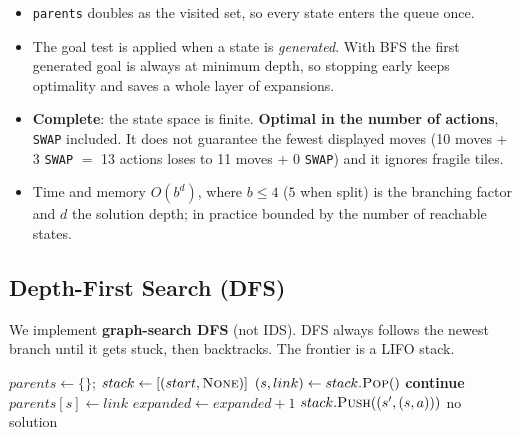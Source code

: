 \begin{itemize}[leftmargin=*]
\item \texttt{parents} doubles as the visited set, so every state enters the queue once.
\item The goal test is applied when a state is \emph{generated}. With BFS the first generated goal
is always at minimum depth, so stopping early keeps optimality and saves a whole layer of
expansions.
\item \textbf{Complete}: the state space is finite. \textbf{Optimal in the number of actions},
\texttt{SWAP} included. It does not guarantee the fewest displayed moves (10 moves $+$ 3
\texttt{SWAP} $=$ 13 actions loses to 11 moves $+$ 0 \texttt{SWAP}) and it ignores fragile tiles.
\item Time and memory $O(b^d)$, where $b \le 4$ ($5$ when split) is the branching factor and $d$
the solution depth; in practice bounded by the number of reachable states.
\end{itemize}

\subsection{Depth-First Search (DFS)}

We implement \textbf{graph-search DFS} (not IDS). DFS always follows the newest branch until it
gets stuck, then backtracks. The frontier is a LIFO stack.

\begin{algorithm}[H]
\caption{DFS (\texttt{solvers/dfs.py})}
\label{alg:dfs}
\begin{algorithmic}[1]
\State $parents \gets \{\}$; $stack \gets [(start, \textsc{None})]$
  \State $(s, link) \gets stack.\textsc{Pop}()$
   \textbf{continue} \EndIf
  \State $parents[s] \gets link$ 
   \Return {} \EndIf
  \State $expanded \gets expanded + 1$
     $stack.\textsc{Push}((s', (s, a)))$ \EndIf
  \EndFor
\EndWhile
\State \Return no solution
\end{algorithmic}
\end{algorithm}

